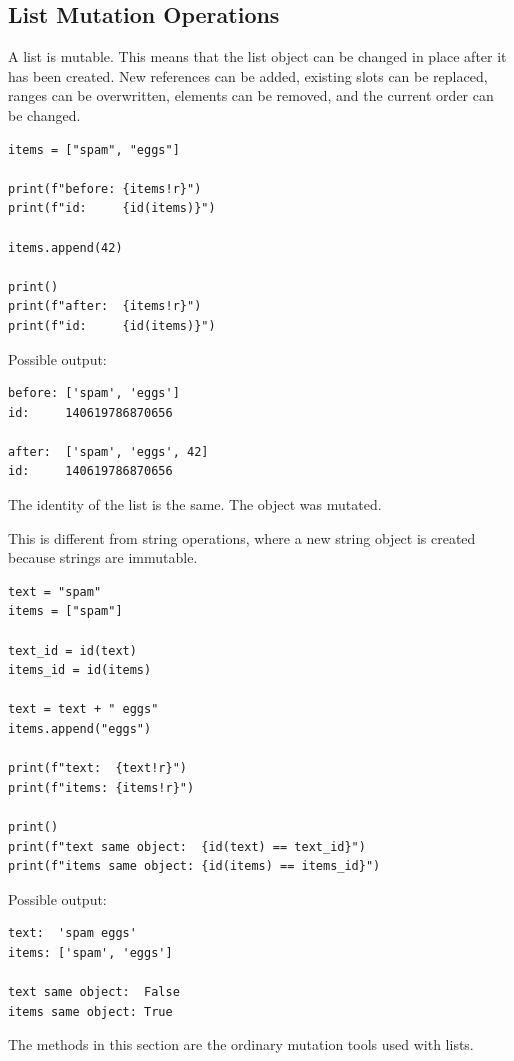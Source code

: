 \subsection{List Mutation Operations}

A list is mutable. This means that the list object can be changed in place after it has been created. New references can be added, existing slots can be replaced, ranges can be overwritten, elements can be removed, and the current order can be changed.

\begin{verbatim}
items = ["spam", "eggs"]

print(f"before: {items!r}")
print(f"id:     {id(items)}")

items.append(42)

print()
print(f"after:  {items!r}")
print(f"id:     {id(items)}")
\end{verbatim}

Possible output:

\begin{verbatim}
before: ['spam', 'eggs']
id:     140619786870656

after:  ['spam', 'eggs', 42]
id:     140619786870656
\end{verbatim}

The identity of the list is the same. The object was mutated.

This is different from string operations, where a new string object is created because strings are immutable.

\begin{verbatim}
text = "spam"
items = ["spam"]

text_id = id(text)
items_id = id(items)

text = text + " eggs"
items.append("eggs")

print(f"text:  {text!r}")
print(f"items: {items!r}")

print()
print(f"text same object:  {id(text) == text_id}")
print(f"items same object: {id(items) == items_id}")
\end{verbatim}

Possible output:

\begin{verbatim}
text:  'spam eggs'
items: ['spam', 'eggs']

text same object:  False
items same object: True
\end{verbatim}

The methods in this section are the ordinary mutation tools used with lists.

